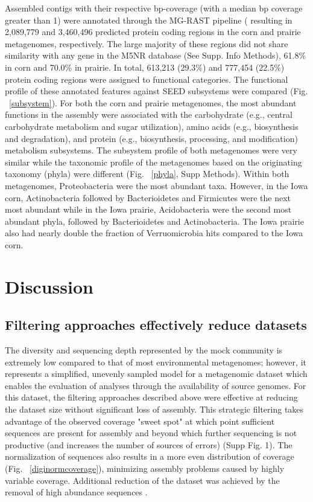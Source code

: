 \documentclass[11pt]{article} %
\begin{document}
Assembled contigs with their respective bp-coverage (with a median bp
coverage greater than 1) were annotated through the MG-RAST pipeline (
resulting in 2,089,779 and 3,460,496 predicted protein coding regions
in the corn and prairie metagenomes, respectively.  The large majority
of these regions did not share similarity with any gene in the M5NR 
database (See Supp. Info Methods), 61.8\% in corn and 70.0\% in prairie.  In total, 613,213 (29.3\%) and
777,454 (22.5\%) protein coding regions were assigned to functional categories.
The functional profile of these annotated features against SEED
subsystems were compared (Fig. ~\ref{subsystem}).  For both the corn
and prairie metagenomes, the most abundant functions in the assembly were associated
with the carbohydrate (e.g., central carbohydrate metabolism and sugar
utilization), amino acids (e.g., biosynthesis and degradation), and
protein (e.g., biosynthesis, processing, and modification)
metabolism subsystems.  The subsystem profile of both metagenomes were very
similar while the taxonomic profile of the metagenomes based on the
originating taxonomy (phyla) were different (Fig. ~\ref{phyla}, Supp
Methods).  Within both metagenomes, Proteobacteria were the most
abundant taxa.  However, in the Iowa corn, Actinobacteria followed by
Bacterioidetes and Firmicutes were the next most abundant while in the
Iowa prairie, Acidobacteria were the second most abundant phyla,
followed by Bacterioidetes and Actinobacteria.  The Iowa prairie also
had nearly double the fraction of Verruomicrobia hits compared to the Iowa
corn.


\section{Discussion}

\subsection{Filtering approaches effectively reduce datasets} 

The diversity and sequencing depth represented by the mock community
is extremely low compared to that of most environmental metagenomes;
however, it represents a simplified, unevenly sampled model for a
metagenomic dataset which enables the evaluation of analyses through
the availability of source genomes.  For this dataset, the filtering
approaches described above were effective at reducing the dataset size
without significant loss of assembly.  This strategic filtering takes
advantage of the observed coverage "sweet spot" at which point
sufficient sequences are present for assembly and beyond which further
sequencing is not productive (and increases the number of sources of
errors) (Supp Fig. 1).  The normalization of sequences also results in
a more even distribution of coverage (Fig. ~\ref{diginormcoverage}),
minimizing assembly problems caused by highly variable coverage.
Additional reduction of the dataset was achieved by the removal of
high abundance sequences \cite{howeartifacts}.
\end{document}
